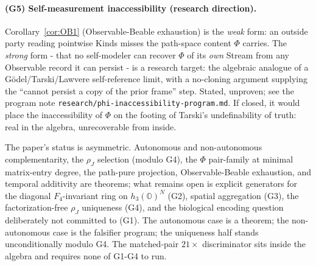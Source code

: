 \documentclass[12pt]{article}
\theoremstyle{remark}
\newcommand{\hthree}{h_3(\mathbb{O})}
\newcommand{\Ffour}{F_4}
\newcommand{\rhoJ}{\rho_J}
\newcommand{\Phiexp}{\Phi}
\begin{document}
\paragraph{(G5) Self-measurement inaccessibility (research direction).}
Corollary~\ref{cor:OB1} (Observable-Beable exhaustion) is the \emph{weak}
form: an outside party reading pointwise Kinds misses the path-space content
$\Phiexp$ carries. The \emph{strong} form - that no self-modeler can recover
$\Phiexp$ of its \emph{own} Stream from any Observable record it can persist -
is a research target: the algebraic analogue of a G\"odel/Tarski/Lawvere
self-reference limit, with a no-cloning argument supplying the
``cannot persist a copy of the prior frame'' step. Stated, unproven; see the
program note \texttt{research/phi-inaccessibility-program.md}. If closed, it
would place the inaccessibility of $\Phiexp$ on the footing of Tarski's
undefinability of truth: real in the algebra, unrecoverable from inside.

\bigskip

\noindent
The paper's status is asymmetric. Autonomous and non-autonomous
complementarity, the $\rhoJ$ selection (modulo G4), the $\Phiexp$
pair-family at minimal matrix-entry degree, the path-pure
projection, Observable-Beable exhaustion, and temporal additivity
are theorems; what remains open is explicit generators for the
diagonal $\Ffour$-invariant ring on $\hthree^N$ (G2), spatial
aggregation (G3), the factorization-free $\rhoJ$ uniqueness (G4),
and the biological encoding question deliberately not committed
to (G1). The autonomous case is a theorem; the non-autonomous
case is the falsifier program; the uniqueness half stands
unconditionally modulo G4. The matched-pair $21\times$
discriminator sits inside the algebra and requires none of G1-G4
to run.

\end{document}
